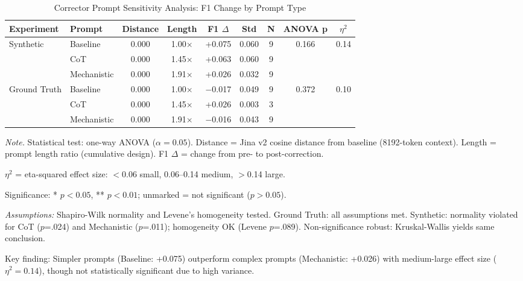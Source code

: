 \begin{table}[H]
\centering
\caption{Corrector Prompt Sensitivity Analysis: F1 Change by Prompt Type}
\label{tab:corrector_sensitivity}
\begin{threeparttable}
\begin{tabular}{llccccccc}
\toprule
\textbf{Experiment} & \textbf{Prompt} & \textbf{Distance} & \textbf{Length} & \textbf{F1 $\Delta$} & \textbf{Std} & \textbf{N} & \textbf{ANOVA p} & \textbf{$\eta^2$} \\
\midrule
Synthetic & Baseline & 0.000 & 1.00$\times$ & +0.075 & 0.060 & 9 & 0.166 & 0.14 \\
 & CoT & 0.000 & 1.45$\times$ & +0.063 & 0.060 & 9 &  & \\
 & Mechanistic & 0.000 & 1.91$\times$ & +0.026 & 0.032 & 9 &  & \\
\midrule
Ground Truth & Baseline & 0.000 & 1.00$\times$ & $-$0.017 & 0.049 & 9 & 0.372 & 0.10 \\
 & CoT & 0.000 & 1.45$\times$ & +0.026 & 0.003 & 3 &  & \\
 & Mechanistic & 0.000 & 1.91$\times$ & $-$0.016 & 0.043 & 9 &  & \\
\bottomrule
\end{tabular}
\begin{tablenotes}
\small
\item \textit{Note.} Statistical test: one-way ANOVA ($\alpha=0.05$). Distance = Jina v2 cosine distance from baseline (8192-token context). Length = prompt length ratio (cumulative design). F1 $\Delta$ = change from pre- to post-correction.
\item $\eta^2$ = eta-squared effect size: $<$0.06 small, 0.06--0.14 medium, $>$0.14 large.
\item Significance: * $p<0.05$, ** $p<0.01$; unmarked = not significant ($p>0.05$).
\item \textit{Assumptions:} Shapiro-Wilk normality and Levene's homogeneity tested. Ground Truth: all assumptions met. Synthetic: normality violated for CoT ($p$=.024) and Mechanistic ($p$=.011); homogeneity OK (Levene $p$=.089). Non-significance robust: Kruskal-Wallis yields same conclusion.
\item Key finding: Simpler prompts (Baseline: +0.075) outperform complex prompts (Mechanistic: +0.026) with medium-large effect size ($\eta^2 = 0.14$), though not statistically significant due to high variance.
\end{tablenotes}
\end{threeparttable}
\end{table}

